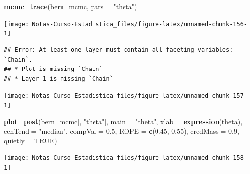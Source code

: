 \documentclass[
  12pt,
]{book}
\newenvironment{Shaded}{\begin{snugshade}}{\end{snugshade}}
\newcommand{\DataTypeTok}[1]{\textcolor[rgb]{0.13,0.29,0.53}{#1}}
\newcommand{\FloatTok}[1]{\textcolor[rgb]{0.00,0.00,0.81}{#1}}
\newcommand{\KeywordTok}[1]{\textcolor[rgb]{0.13,0.29,0.53}{\textbf{#1}}}
\newcommand{\NormalTok}[1]{#1}
\newcommand{\OperatorTok}[1]{\textcolor[rgb]{0.81,0.36,0.00}{\textbf{#1}}}
\newcommand{\OtherTok}[1]{\textcolor[rgb]{0.56,0.35,0.01}{#1}}
\newcommand{\StringTok}[1]{\textcolor[rgb]{0.31,0.60,0.02}{#1}}
\theoremstyle{definition}
\theoremstyle{definition}
\theoremstyle{definition}
\theoremstyle{remark}
\begin{document}
\begin{Shaded}
\begin{Highlighting}[]
\KeywordTok{mcmc_trace}\NormalTok{(bern_mcmc, }\DataTypeTok{pars =} \StringTok{"theta"}\NormalTok{)}
\end{Highlighting}
\end{Shaded}

\begin{center}\texttt{[image: Notas-Curso-Estadistica\_files/figure-latex/unnamed-chunk-156-1]} \end{center}

\begin{Shaded}
\end{Shaded}

\begin{verbatim}
## Error: At least one layer must contain all faceting variables: `Chain`.
## * Plot is missing `Chain`
## * Layer 1 is missing `Chain`
\end{verbatim}

\begin{center}\texttt{[image: Notas-Curso-Estadistica\_files/figure-latex/unnamed-chunk-157-1]} \end{center}

\begin{Shaded}
\begin{Highlighting}[]
\KeywordTok{plot_post}\NormalTok{(bern_mcmc[, }\StringTok{"theta"}\NormalTok{], }\DataTypeTok{main =} \StringTok{"theta"}\NormalTok{, }\DataTypeTok{xlab =} \KeywordTok{expression}\NormalTok{(theta), }
    \DataTypeTok{cenTend =} \StringTok{"median"}\NormalTok{, }\DataTypeTok{compVal =} \FloatTok{0.5}\NormalTok{, }\DataTypeTok{ROPE =} \KeywordTok{c}\NormalTok{(}\FloatTok{0.45}\NormalTok{, }
        \FloatTok{0.55}\NormalTok{), }\DataTypeTok{credMass =} \FloatTok{0.9}\NormalTok{, }\DataTypeTok{quietly =} \OtherTok{TRUE}\NormalTok{)}
\end{Highlighting}
\end{Shaded}

\begin{center}\texttt{[image: Notas-Curso-Estadistica\_files/figure-latex/unnamed-chunk-158-1]} \end{center}
\end{document}
